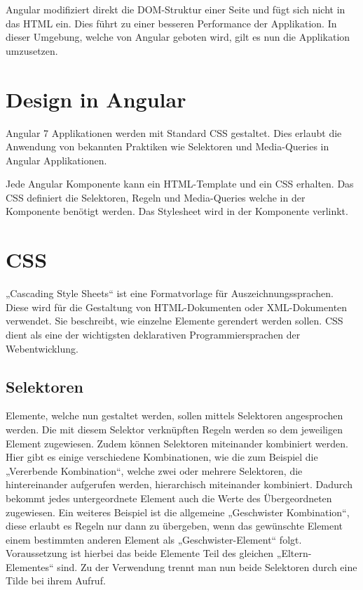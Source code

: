 Angular modifiziert direkt die DOM-Struktur einer Seite und fügt sich nicht in das HTML ein. Dies führt zu einer besseren Performance der Applikation.
In dieser Umgebung, welche von Angular geboten wird, gilt es nun die Applikation umzusetzen.

\section{Design in Angular}
Angular\cite{AngularDokumentation} 7 Applikationen werden mit Standard CSS gestaltet. Dies erlaubt die Anwendung von bekannten Praktiken wie Selektoren und Media-Queries in Angular Applikationen.

Jede Angular Komponente kann ein HTML-Template und ein CSS erhalten. Das CSS definiert die Selektoren, Regeln und Media-Queries welche in der Komponente benötigt werden. Das Stylesheet wird in der Komponente verlinkt.

\section{CSS}

„Cascading Style Sheets“\cite{CSS} ist eine Formatvorlage für Auszeichnungssprachen. Diese wird für die Gestaltung von HTML-Dokumenten oder XML-Dokumenten verwendet. Sie beschreibt, wie einzelne Elemente gerendert werden sollen. CSS dient als eine der wichtigsten deklarativen Programmiersprachen der Webentwicklung.

\subsection{Selektoren}
Elemente, welche nun gestaltet werden, sollen mittels Selektoren angesprochen werden. Die mit diesem Selektor verknüpften Regeln werden so dem jeweiligen Element zugewiesen. Zudem können Selektoren miteinander kombiniert werden. Hier gibt es einige verschiedene Kombinationen, wie die zum Beispiel die „Vererbende Kombination“, welche zwei oder mehrere Selektoren, die hintereinander aufgerufen werden, hierarchisch miteinander kombiniert. Dadurch bekommt jedes untergeordnete Element auch die Werte des Übergeordneten zugewiesen. Ein weiteres Beispiel ist die allgemeine „Geschwister Kombination“, diese erlaubt es Regeln nur dann zu übergeben, wenn das gewünschte Element einem bestimmten anderen Element als „Geschwister-Element“ folgt. Voraussetzung ist hierbei das beide Elemente Teil des gleichen „Eltern-Elementes“ sind. Zu der Verwendung trennt man nun beide Selektoren durch eine Tilde bei ihrem Aufruf.

